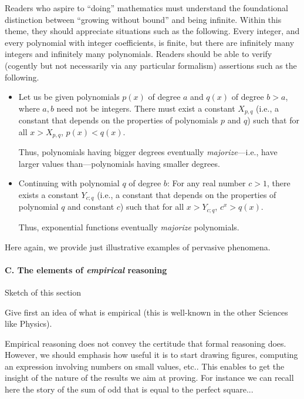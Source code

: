 Readers who aspire to ``doing'' mathematics must understand the
foundational distinction between ``growing without bound'' and being
infinite.  Within this theme, they should appreciate situations such
as the following.  Every integer, and every polynomial with integer
coefficients, is finite, but there are infinitely many integers and
infinitely many polynomials.  Readers should be able to verify
(cogently but not necessarily via any particular formalism) assertions
such as the following.
\begin{itemize}
\item
Let us be given polynomials $p(x)$ of degree $a$ and $q(x)$ of degree
$b > a$, where $a, b$ need not be integers.  There must exist a
constant $X_{p,q}$ (i.e., a constant that depends on the properties of
polynomials $p$ and $q$) such that for all $x > X_{p,q}$, $p(x) <
q(x)$.

Thus, polynomials having bigger degrees eventually {\em
  majorize}---i.e., have larger values than---polynomials having
smaller degrees.

\item
Continuing with polynomial $q$ of degree $b$: For any real number $c >
1$, there exists a constant $Y_{c;q}$ (i.e., a constant that depends
on the properties of polynomial $q$ and constant $c$) such that for
all $x > Y_{c;q}$, $c^x > q(x)$.

Thus, exponential functions eventually {\em majorize} polynomials.
\end{itemize}
Here again, we provide just illustrative examples of pervasive
phenomena.

\medskip

\paragraph{\small\sf C. The elements of {\em empirical} reasoning}

{\Denis Sketch of this section}

Give first an idea of what is empirical (this is well-known in the other Sciences like Physics). 

Empirical reasoning does not convey the certitude that formal reasoning does.  
However, we should emphasis how useful it is to start drawing figures, computing an expression involving numbers on small values, etc..
This enables to get the insight of the nature of the results we aim at proving.
For instance we can recall here the story of the sum of odd that is equal to the perfect square...

